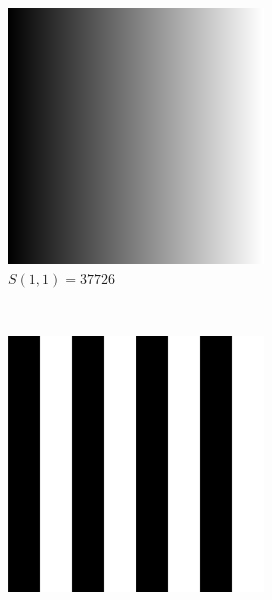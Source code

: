 \documentclass{report}
\begin{document}
\begin{figure}[H]
        \centering
        \begin{subfigure}[b]{0.2\textwidth}
                \includegraphics[width=\textwidth]{graphics/horizontalGrad.png}
                \caption{$S(1,1) = 37726$}
        \end{subfigure}
        ~~~
        \begin{subfigure}[b]{0.2\textwidth}
        		\includegraphics[width=\textwidth]{graphics/smallVertical.png}

\end{subfigure}
\end{figure}
\end{document}
